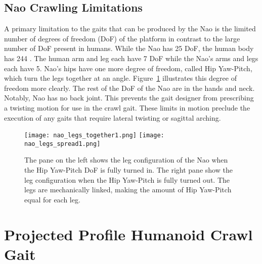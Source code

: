 \subsection{Nao Crawling Limitations}

A primary limitation to the gaits that can be produced by the Nao is the limited number of degrees of freedom (DoF) of the platform
in contrast to the large number of DoF present in humans. While the Nao has 25 DoF, the human body has 244 \cite{zatsiorskybiomechanics}.
The human arm and leg each have 7 DoF while the Nao's arms and legs each have 5. 
Nao's hips have one more degree of freedom, called Hip Yaw-Pitch, which turn the legs together at an angle. 
Figure~\ref{fig:nao_hips_legs1} illustrates this degree of freedom more clearly. 
The rest of the DoF of the Nao are in the hands and neck. 
Notably, Nao has no back joint. This prevents the gait designer from prescribing a twisting motion for use in the crawl gait.
These limits in motion preclude the execution of any gaits that require lateral twisting or sagittal arching.

\begin{figure}
	\vspace*{-0.07in}
	\centerline{\texttt{[image: nao\_legs\_together1.png]}
				\texttt{[image: nao\_legs\_spread1.png]}
				}
	\caption{The pane on the left shows the leg configuration of the Nao when the Hip Yaw-Pitch DoF is fully turned in.
				The right pane show the leg configuration when the Hip Yaw-Pitch is fully turned out. 
				The legs are mechanically linked, making the amount of Hip Yaw-Pitch equal for each leg.}
	\label{fig:nao_hips_legs1}
	\vspace*{-0.2in}
\end{figure}

\section{Projected Profile Humanoid Crawl Gait}


